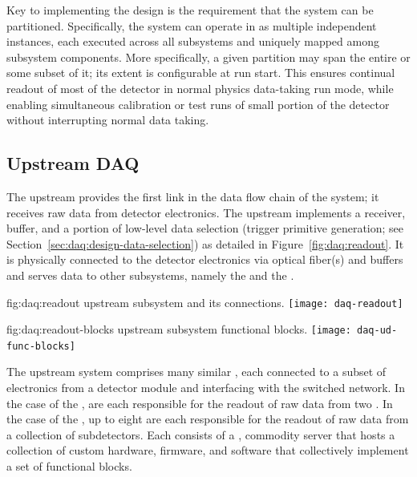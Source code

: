 Key to implementing the  design is the requirement that
the system can be partitioned. Specifically, the system can operate in
as multiple independent  instances, each 
executed across all  subsystems and uniquely mapped among subsystem components. 
More specifically, a given partition may span the entire 
 or some subset of it; its extent is configurable at
run start. This ensures continual readout of most of the detector in normal physics data-taking run mode, while
enabling simultaneous calibration or test runs of small portion of the
detector without interrupting normal data taking. 

\subsection{Upstream DAQ}
\label{sec:daq:design-upstream}

The upstream  provides the first link in the data flow chain of
the  system; it receives raw data from detector electronics.
The upstream  implements a receiver, buffer, and a portion of low-level data
selection (trigger primitive generation; see Section~\ref{sec:daq:design-data-selection}) as detailed in Figure~\ref{fig:daq:readout}.
It is physically connected to the detector electronics via optical
fiber(s) and buffers and serves data to other  subsystems,
namely the  and the .

\begin{dunefigure}{fig:daq:readout}{ upstream  subsystem and its connections.}
  \texttt{[image: daq-readout]}
\end{dunefigure}

\begin{dunefigure}{fig:daq:readout-blocks}{ upstream
     subsystem functional blocks.}
 \texttt{[image: daq-ud-func-blocks]}
\end{dunefigure}

The upstream  system comprises many similar , each
connected to a subset of electronics from a detector module and
interfacing with the  switched network. In the case of the
,   are each responsible for the readout of raw data from two
. In the case of the , up to eight  are each responsible for the
readout of raw data from a collection of  subdetectors. 
Each  consists of a , commodity server that hosts a
collection of custom hardware, 
firmware, and software that collectively implement a set of functional blocks.

